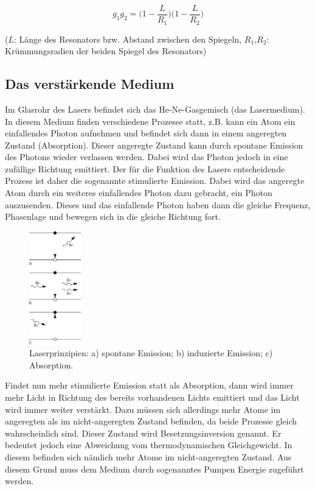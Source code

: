 \begin{equation}
  g_1g_2 = \biggl(1-\frac{L}{R_1}\biggr)\biggl(1-\frac{L}{R_2}\biggr)
\end{equation}

($L$: Länge des Resonators bzw. Abstand zwischen den Spiegeln, $R_1$,$R_2$: Krümmungsradien der beiden Spiegel des Resonators)

\subsection{Das verstärkende Medium}

Im Glasrohr des Lasers befindet sich das He-Ne-Gasgemisch (das Lasermedium). In diesem Medium finden verschiedene Prozesse
statt, z.B. kann ein Atom ein einfallendes Photon aufnehmen und befindet sich dann in einem angeregten Zustand (Absorption).
Dieser angeregte Zustand kann durch spontane Emission des Photons wieder verlassen werden. Dabei wird das Photon jedoch
in eine zufällige Richtung emittiert. Der für die Funktion des Lasers entscheidende Prozess ist daher die sogenannte stimulierte
Emission. Dabei wird das angeregte Atom durch ein weiteres einfallendes Photon dazu gebracht, ein Photon auszusenden.
Dieses und das einfallende Photon haben dann die gleiche Frequenz, Phasenlage und bewegen sich in die gleiche Richtung fort.

\begin{figure}
\centering
\includegraphics[width=0.2\textwidth]{emission.jpg}
\caption{Laserprinzipien: a) spontane Emission; b) induzierte Emission; c) Absorption.\cite{spektrum}}
\label{fig:emission}
\end{figure}

Findet nun mehr stimulierte Emission statt als Absorption, dann wird immer mehr Licht in Richtung des
bereits vorhandenen Lichts emittiert und das Licht wird immer weiter verstärkt. Dazu müssen sich allerdings mehr Atome im
angeregten als im nicht-angeregten Zustand befinden, da beide Prozesse gleich wahrscheinlich sind. Dieser Zustand wird
Besetzungsinversion genannt.
Er bedeutet jedoch eine Abweichung vom thermodynamischen Gleichgewicht. In diesem befinden sich nämlich mehr Atome im nicht-angeregten
Zustand. Aus diesem Grund muss dem Medium durch sogenanntes Pumpen Energie zugeführt werden.

